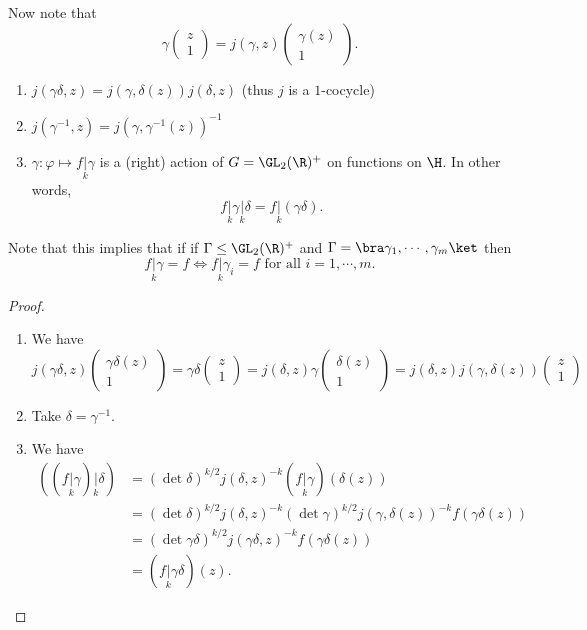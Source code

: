 \documentclass[a4paper]{article}
\begin{document}
Now note that
\[
  \gamma
  \begin{pmatrix}
    z\\1
  \end{pmatrix}
  = j(\gamma, z)
  \begin{pmatrix}
    \gamma(z)\\1
  \end{pmatrix}.\tag{$*$}
\]
\begin{prop}\leavevmode
  \begin{enumerate}
    \item $j(\gamma\delta, z) = j(\gamma, \delta(z)) j(\delta, z)$ (thus $j$ is a $1$-cocycle)
    \item $j(\gamma^{-1}, z) = j (\gamma, \gamma^{-1}(z))^{-1}$
    \item $\gamma: \varphi \mapsto f\underset{k}{|} \gamma$ is a (right) action of $G = \GL_2(\R)^+$ on functions on $\H$. In other words,
      \[
        f\underset{k}{|} \gamma \underset{k}{|} \delta = f\underset{k}{|}(\gamma\delta).
      \]
  \end{enumerate}
\end{prop}
Note that this implies that if if $\Gamma \leq \GL_2(\R)^+$ and $\Gamma = \bra \gamma_1, \cdots, \gamma_m\ket$ then
\[
  f\underset{k}{|} \gamma = f\Longleftrightarrow f\underset{k}{|} \gamma_i = f\text{ for all }i = 1, \cdots, m.
\]
\begin{proof}\leavevmode
  \begin{enumerate}
    \item We have
      \[
        j(\gamma\delta, z)
        \begin{pmatrix}
          \gamma\delta(z)\\
          1
        \end{pmatrix} =
        \gamma\delta
        \begin{pmatrix}
          z\\1
        \end{pmatrix}
        =
        j(\delta, z) \gamma
        \begin{pmatrix}
          \delta(z)\\
          1
        \end{pmatrix}
        =
        j(\delta, z) j(\gamma, \delta(z))
        \begin{pmatrix}
          z\\1
        \end{pmatrix}
      \]
    \item Take $\delta = \gamma^{-1}$.
    \item We have
      \begin{align*}
        ((f\underset{k}{|} \gamma) \underset{k}{|} \delta) &= (\det \delta)^{k/2} j(\delta, z)^{-k} (f\underset{k}{|} \gamma) (\delta(z))\\
        &= (\det \delta)^{k/2} j(\delta, z)^{-k} (\det \gamma)^{k/2} j(\gamma, \delta(z))^{-k} f(\gamma\delta(z))\\
        &= (\det \gamma \delta)^{k/2} j(\gamma \delta, z)^{-k} f(\gamma\delta(z))\\
        &= (f\underset{k}{|} \gamma\delta) (z).
      \end{align*}
  \end{enumerate}
\end{proof}
\end{document}
